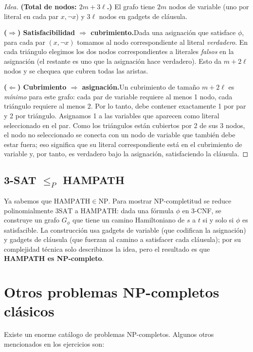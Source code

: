 \documentclass[11pt,a4paper]{article}
\theoremstyle{definicion}
\newcommand{\redP}{\leq_{P}}
\newcommand{\NP}{\mathrm{NP}}
\begin{document}
\begin{proof}[Idea]
\textbf{(Total de nodos: $2m + 3\ell$.)} El grafo tiene $2m$ nodos de variable (uno por literal en cada par $x, \neg x$) y $3\ell$ nodos en gadgets de cláusula.

\textbf{($\Rightarrow$) Satisfacibilidad $\Rightarrow$ cubrimiento.}\quad Dada una asignación que satisface $\phi$, para cada par $(x, \neg x)$ tomamos al nodo correspondiente al literal \emph{verdadero}. En cada triángulo elegimos los dos nodos correspondientes a literales \emph{falsos} en la asignación (el restante es uno que la asignación hace verdadero). Esto da $m + 2\ell$ nodos y se chequea que cubren todas las aristas.

\textbf{($\Leftarrow$) Cubrimiento $\Rightarrow$ asignación.}\quad Un cubrimiento de tamaño $m + 2\ell$ es \emph{mínimo} para este grafo: cada par de variable requiere al menos 1 nodo, cada triángulo requiere al menos 2. Por lo tanto, debe contener exactamente 1 por par y 2 por triángulo. Asignamos 1 a las variables que aparecen como literal seleccionado en el par. Como los triángulos están cubiertos por 2 de sus 3 nodos, el nodo no seleccionado se conecta con un nodo de variable que también debe estar fuera; eso significa que su literal correspondiente está en el cubrimiento de variable y, por tanto, es verdadero bajo la asignación, satisfaciendo la cláusula.
\end{proof}

\subsection{3-SAT $\redP$ HAMPATH}

Ya sabemos que $\mathrm{HAMPATH} \in \NP$. Para mostrar NP-completitud se reduce polinomialmente $3\mathrm{SAT}$ a $\mathrm{HAMPATH}$: dada una fórmula $\phi$ en 3-CNF, se construye un grafo $G_\phi$ que tiene un camino Hamiltoniano de $s$ a $t$ si y solo si $\phi$ es satisfacible. La construcción usa gadgets de variable (que codifican la asignación) y gadgets de cláusula (que fuerzan al camino a satisfacer cada cláusula); por su complejidad técnica solo describimos la idea, pero el resultado es que \textbf{HAMPATH es NP-completo}.

\section{Otros problemas NP-completos clásicos}

Existe un enorme catálogo de problemas NP-completos. Algunos otros mencionados en los ejercicios son:
\end{document}
